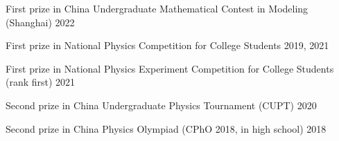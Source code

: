 \documentclass[11pt]{article} %
\begin{document}
First prize in China Undergraduate Mathematical Contest in Modeling (Shanghai)
\hfill 2022

First prize in National Physics Competition for College Students
\hfill 2019, 2021

First prize in National Physics Experiment Competition for College Students  (rank first)
\hfill 2021

Second prize in China Undergraduate Physics Tournament (CUPT)
\hfill 2020

Second prize in China Physics Olympiad (CPhO 2018, in high school)
\hfill 2018






\end{document}
